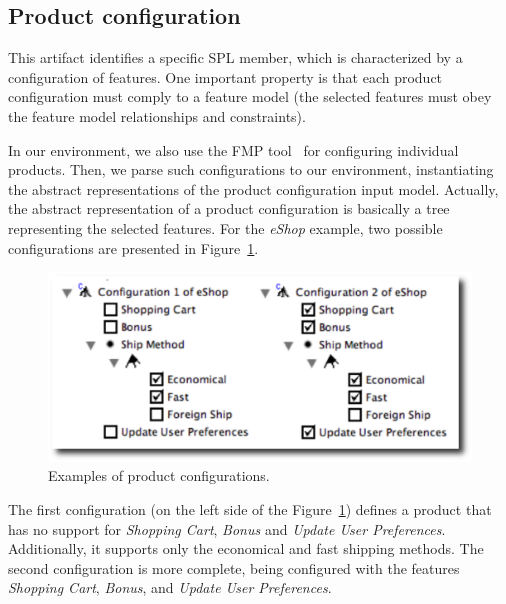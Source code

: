 \subsection{Product configuration}\label{subsub:pc}

This artifact identifies a specific SPL member, which is characterized by a
configuration of features. One important property is that each product
configuration must comply to a feature model (the selected features must obey
the feature model relationships and constraints).

{\color{red}In our environment, we also use the FMP
tool~\cite{Czarnecki:2004aa} for configuring individual products. Then,
we parse such configurations to our
environment, instantiating the abstract representations of the product
configuration input model. Actually, the abstract representation of a product
configuration is basically a tree representing the selected features. For the
\emph{eShop} example, two possible configurations are presented in
Figure~\ref{fig:product-config-01-02}.}

 \begin{figure}[h]
 \begin{center}
  \includegraphics[scale=0.33]{img/pc-04.eps}
   \caption{Examples of product configurations.}
  \label{fig:product-config-01-02}
  \end{center}
\end{figure}

The first configuration (on the left side of the
Figure~\ref{fig:product-config-01-02}) defines a product that has no support for
\emph{Shopping Cart}, \emph{Bonus} and \emph{Update User Preferences}.
Additionally, it supports only the economical and fast shipping methods. The
second configuration is more complete, being configured with the features
\emph{Shopping Cart}, \emph{Bonus}, and \emph{Update User Preferences}.

